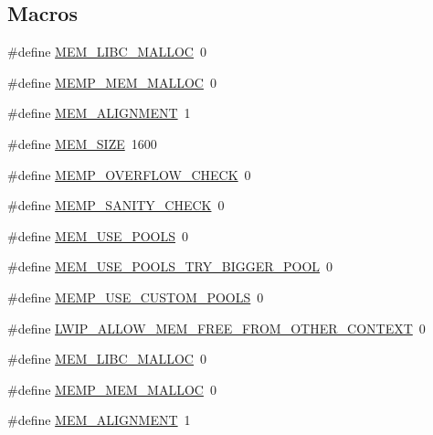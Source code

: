 \subsection*{Macros}
\begin{DoxyCompactItemize}
\item 
\#define \hyperlink{group__lwip__opts__mem_ga4ef345cc270912bd2230b1c5ec51dfc8}{M\+E\+M\+\_\+\+L\+I\+B\+C\+\_\+\+M\+A\+L\+L\+OC}~0
\item 
\#define \hyperlink{group__lwip__opts__mem_gae93af697d27bbcefa6a28052d90f2f38}{M\+E\+M\+P\+\_\+\+M\+E\+M\+\_\+\+M\+A\+L\+L\+OC}~0
\item 
\#define \hyperlink{group__lwip__opts__mem_ga97343214666ee6dcb18c0bd77b441ea7}{M\+E\+M\+\_\+\+A\+L\+I\+G\+N\+M\+E\+NT}~1
\item 
\#define \hyperlink{group__lwip__opts__mem_ga2dcf8c45f945dd0c4301a94700f2112c}{M\+E\+M\+\_\+\+S\+I\+ZE}~1600
\item 
\#define \hyperlink{group__lwip__opts__mem_ga27fdd01194a42fc41a7716b72cdb49e3}{M\+E\+M\+P\+\_\+\+O\+V\+E\+R\+F\+L\+O\+W\+\_\+\+C\+H\+E\+CK}~0
\item 
\#define \hyperlink{group__lwip__opts__mem_ga0838947193e222a9f46b582e01e5beff}{M\+E\+M\+P\+\_\+\+S\+A\+N\+I\+T\+Y\+\_\+\+C\+H\+E\+CK}~0
\item 
\#define \hyperlink{group__lwip__opts__mem_gaddca3141bc7037241769eb152b6f89ba}{M\+E\+M\+\_\+\+U\+S\+E\+\_\+\+P\+O\+O\+LS}~0
\item 
\#define \hyperlink{group__lwip__opts__mem_gaba8be68e8fd0716b723ce4569ed89f82}{M\+E\+M\+\_\+\+U\+S\+E\+\_\+\+P\+O\+O\+L\+S\+\_\+\+T\+R\+Y\+\_\+\+B\+I\+G\+G\+E\+R\+\_\+\+P\+O\+OL}~0
\item 
\#define \hyperlink{group__lwip__opts__mem_ga69de593b8ffd4f1c249f03e48e11983b}{M\+E\+M\+P\+\_\+\+U\+S\+E\+\_\+\+C\+U\+S\+T\+O\+M\+\_\+\+P\+O\+O\+LS}~0
\item 
\#define \hyperlink{group__lwip__opts__mem_ga0a3ef6098813c103e5aba07da76e15e2}{L\+W\+I\+P\+\_\+\+A\+L\+L\+O\+W\+\_\+\+M\+E\+M\+\_\+\+F\+R\+E\+E\+\_\+\+F\+R\+O\+M\+\_\+\+O\+T\+H\+E\+R\+\_\+\+C\+O\+N\+T\+E\+XT}~0
\item 
\#define \hyperlink{group__lwip__opts__mem_ga4ef345cc270912bd2230b1c5ec51dfc8}{M\+E\+M\+\_\+\+L\+I\+B\+C\+\_\+\+M\+A\+L\+L\+OC}~0
\item 
\#define \hyperlink{group__lwip__opts__mem_gae93af697d27bbcefa6a28052d90f2f38}{M\+E\+M\+P\+\_\+\+M\+E\+M\+\_\+\+M\+A\+L\+L\+OC}~0
\item 
\#define \hyperlink{group__lwip__opts__mem_ga97343214666ee6dcb18c0bd77b441ea7}{M\+E\+M\+\_\+\+A\+L\+I\+G\+N\+M\+E\+NT}~1

\end{DoxyCompactItemize}
